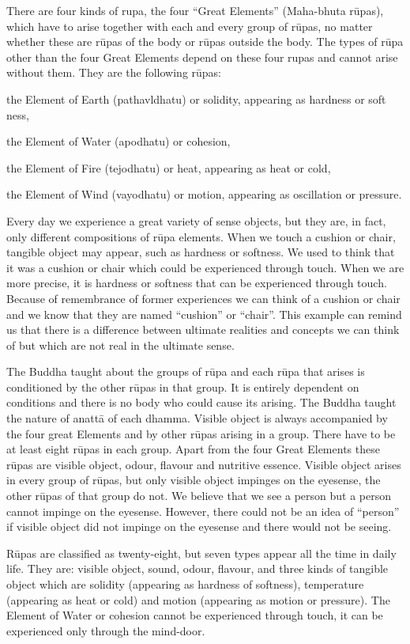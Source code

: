 There are four kinds of rupa, the four ``Great Elements'' (Maha-bhuta rūpas), which 
have to arise together with each and every group of rūpas, no matter whether these 
are rūpas of the body or rūpas outside the body. The types of rūpa other than the four 
Great Elements depend on these four rupas and cannot arise without them. They are 
the following rūpas: 

the Element of Earth (pathavldhatu) or solidity, appearing as hardness or soft 
ness, 

the Element of Water (apodhatu) or cohesion, 

the Element of Fire (tejodhatu) or heat, appearing as heat or cold, 

the Element of Wind (vayodhatu) or motion, appearing as oscillation or pressure. 

Every day we experience a great variety of sense objects, but they are, in fact, only 
different compositions of rūpa elements. When we touch a cushion or chair, tangible 
object may appear, such as hardness or softness. We used to think that it was a cushion or chair which could be experienced through touch. When we are more precise, it 
is hardness or softness that can be experienced through touch. Because of remembrance of former experiences we can think of a cushion or chair and we know that 
they are named ``cushion'' or ``chair''. This example can remind us that there is a difference between ultimate realities and concepts we can think of but which are not real 
in the ultimate sense. 

The Buddha taught about the groups of rūpa and each rūpa that arises is conditioned 
by the other rūpas in that group. It is entirely dependent on conditions and there is no 
body who could cause its arising. The Buddha taught the nature of anattā of each 
dhamma. Visible object is always accompanied by the four great Elements and by 
other rūpas arising in a group. There have to be at least eight rūpas in each group. 
Apart from the four Great Elements these rūpas are visible object, odour, flavour and 
nutritive essence. Visible object arises in every group of rūpas, but only visible object 
impinges on the eyesense, the other rūpas of that group do not. We believe that we 
see a person but a person cannot impinge on the eyesense. However, there could not 
be an idea of ``person'' if visible object did not impinge on the eyesense and there 
would not be seeing. 

Rūpas are classified as twenty-eight, but seven types appear all the time in daily life. 
They are: visible object, sound, odour, flavour, and three kinds of tangible object which 
are solidity (appearing as hardness of softness), temperature (appearing as heat or 
cold) and motion (appearing as motion or pressure). The Element of Water or cohesion cannot be experienced through touch, it can be experienced only through the 
mind-door. 

